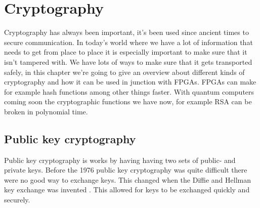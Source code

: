 \chapter{Cryptography\label{crypto}}
Cryptography has always been important, it's been used since ancient times to
secure communication. In today's world where we have a lot of information that
needs to get from place to place it is especially important to make sure that
it isn't tampered with. We have lots of ways to make sure that it gets
transported safely, in this chapter we're going to give an overview about
different kinds of cryptography and how it can be used in junction with FPGAs.
FPGAs can make for example hash functions among other things faster. With
quantum computers coming soon the cryptographic functions we have now, for
example RSA can be broken in polynomial time.

\section{Public key cryptography}
Public key cryptography is works by having having two sets of public- and
private keys. Before the 1976 public key cryptography was quite difficult there
were no good way to exchange keys. This changed when the Diffie and Hellman key
exchange was invented \citep{FranciscoRodriguez-Henriquez10}. This allowed for
keys to be exchanged quickly and securely.


